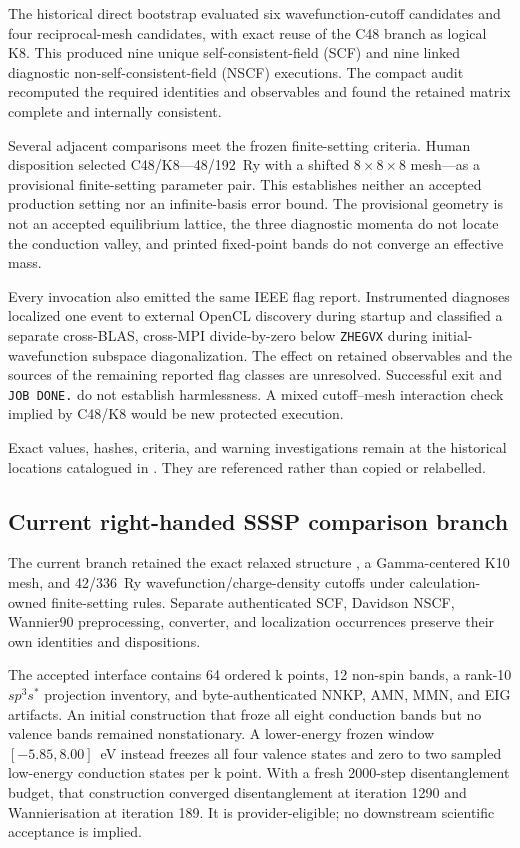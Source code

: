 \documentclass[11pt]{article}
\begin{document}
The historical direct bootstrap evaluated six wavefunction-cutoff candidates and four
reciprocal-mesh candidates, with exact reuse of the C48 branch as logical K8.  This
produced nine unique self-consistent-field (SCF) and nine linked diagnostic
non-self-consistent-field (NSCF) executions.  The compact audit recomputed the required
identities and observables and found the retained matrix complete and internally
consistent.

Several adjacent comparisons meet the frozen finite-setting criteria.  Human
disposition selected C48/K8---48/192~Ry with a shifted $8\times8\times8$ mesh---as a
provisional finite-setting parameter pair.  This establishes neither an accepted
production setting nor an infinite-basis error bound.  The provisional geometry is not
an accepted equilibrium lattice, the three diagnostic momenta do not locate the
conduction valley, and printed fixed-point bands do not converge an effective mass.

Every invocation also emitted the same IEEE flag report.  Instrumented diagnoses
localized one event to external OpenCL discovery during startup and classified a
separate cross-BLAS, cross-MPI divide-by-zero below \texttt{ZHEGVX} during
initial-wavefunction subspace diagonalization.  The effect on retained observables and
the sources of the remaining reported flag classes are unresolved.  Successful exit
and \texttt{JOB DONE.} do not establish harmlessness.  A mixed cutoff--mesh interaction
check implied by C48/K8 would be new protected execution.

Exact values, hashes, criteria, and warning investigations remain at the historical
locations catalogued in
.  They are referenced rather than
copied or relabelled.

\subsection{Current right-handed SSSP comparison branch}

The current branch retained the exact relaxed structure
, a Gamma-centered K10 mesh, and
42/336~Ry wavefunction/charge-density cutoffs under calculation-owned finite-setting
rules.  Separate authenticated SCF, Davidson NSCF, Wannier90 preprocessing, converter,
and localization occurrences preserve their own identities and dispositions.

The accepted interface contains 64 ordered k points, 12 non-spin bands, a rank-10
\(sp^3s^*\) projection inventory, and byte-authenticated NNKP, AMN, MMN, and EIG
artifacts.  An initial construction that froze all eight conduction bands but no valence
bands remained nonstationary.  A lower-energy frozen window
$[-5.85,8.00]$~eV instead freezes all four valence states and zero to two sampled
low-energy conduction states per k point.  With a fresh 2000-step disentanglement budget,
that construction converged disentanglement at iteration 1290 and Wannierisation at
iteration 189.  It is provider-eligible; no downstream scientific acceptance is implied.
\end{document}
